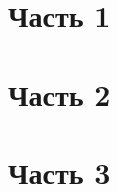 \documentclass[russian,utf8,emptystyle]{eskdtext}
\begin{document}
\clearpage
\clearpage



\tableofcontents





\section{Часть 1}
\section{Часть 2}
\section{Часть 3}















\clearpage
{}
\end{document}
